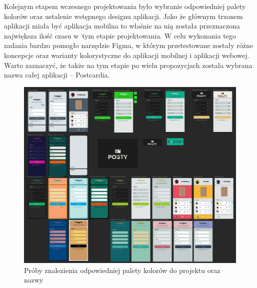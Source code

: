 \documentclass[a4paper,twoside,12pt]{book}
\begin{document}
Kolejnym etapem wczesnego projektowania było wybranie odpowiedniej palety kolorów oraz ustalenie wstępnego designu aplikacji. Jako że głównym trzonem aplikacji miała być aplikacja mobilna to właśnie na nią została przeznaczona największa ilość czasu w~tym etapie projektowania. W celu wykonania tego zadania bardzo pomogło narzędzie Figma, w którym przetestowane zostały różne koncepcje oraz warianty kolorystyczne do aplikacji mobilnej i aplikacji webowej. Warto zaznaczyć, że także na tym etapie po wielu propozycjach została wybrana nazwa całej aplikacji -- Postcardia.
\begin{figure}[H]
    \centering
    \includegraphics[width=1\textwidth]{wizje_ss/figma-colors.png}
    \caption{Próby znalezienia odpowiedniej palety kolorów do projektu oraz nazwy}
\end{figure}
\newpage
\end{document}
